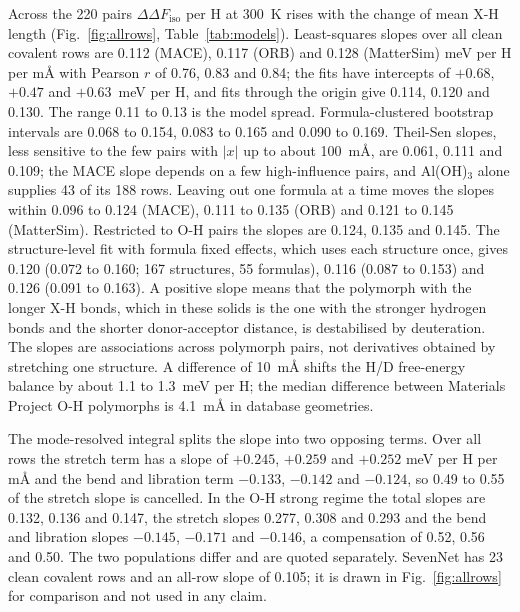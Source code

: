 \documentclass[aps,prmaterials,reprint,superscriptaddress,nofootinbib]{revtex4-2}
\newcommand{\ddF}{\Delta\Delta F_{\mathrm{iso}}}
\begin{document}
Across the 220 pairs $\ddF$ per H at 300~K rises with the change of mean X-H length (Fig.~\ref{fig:allrows}, Table~\ref{tab:models}). Least-squares slopes over all clean covalent rows are 0.112 (MACE), 0.117 (ORB) and 0.128 (MatterSim) meV per H per m\AA{} with Pearson $r$ of 0.76, 0.83 and 0.84; the fits have intercepts of $+0.68$, $+0.47$ and $+0.63$~meV per H, and fits through the origin give 0.114, 0.120 and 0.130. The range 0.11 to 0.13 is the model spread. Formula-clustered bootstrap intervals are 0.068 to 0.154, 0.083 to 0.165 and 0.090 to 0.169. Theil-Sen slopes, less sensitive to the few pairs with $|x|$ up to about 100~m\AA, are 0.061, 0.111 and 0.109; the MACE slope depends on a few high-influence pairs, and Al(OH)$_3$ alone supplies 43 of its 188 rows. Leaving out one formula at a time moves the slopes within 0.096 to 0.124 (MACE), 0.111 to 0.135 (ORB) and 0.121 to 0.145 (MatterSim). Restricted to O-H pairs the slopes are 0.124, 0.135 and 0.145. The structure-level fit with formula fixed effects, which uses each structure once, gives 0.120 (0.072 to 0.160; 167 structures, 55 formulas), 0.116 (0.087 to 0.153) and 0.126 (0.091 to 0.163). A positive slope means that the polymorph with the longer X-H bonds, which in these solids is the one with the stronger hydrogen bonds and the shorter donor-acceptor distance, is destabilised by deuteration. The slopes are associations across polymorph pairs, not derivatives obtained by stretching one structure. A difference of 10~m\AA{} shifts the H/D free-energy balance by about 1.1 to 1.3~meV per H; the median difference between Materials Project O-H polymorphs is 4.1~m\AA{} in database geometries.

The mode-resolved integral splits the slope into two opposing terms. Over all rows the stretch term has a slope of $+0.245$, $+0.259$ and $+0.252$ meV per H per m\AA{} and the bend and libration term $-0.133$, $-0.142$ and $-0.124$, so 0.49 to 0.55 of the stretch slope is cancelled. In the O-H strong regime the total slopes are 0.132, 0.136 and 0.147, the stretch slopes 0.277, 0.308 and 0.293 and the bend and libration slopes $-0.145$, $-0.171$ and $-0.146$, a compensation of 0.52, 0.56 and 0.50. The two populations differ and are quoted separately. SevenNet has 23 clean covalent rows and an all-row slope of 0.105; it is drawn in Fig.~\ref{fig:allrows} for comparison and not used in any claim.
\end{document}
